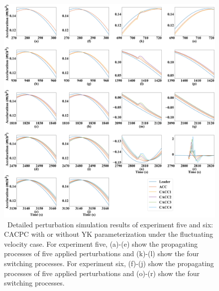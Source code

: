 \documentclass[a4paper,fleqn]{cas-sc}
\begin{document}
\begin{figure}
  \centering
  \includegraphics[width=14cm]{figs/fluat_detail.png}
  \caption{~Detailed perturbation simulation results of experiment five and six: CACPC with or without YK parameterization under the fluctuating velocity case. For experiment five, (a)-(e) show the propagating processes of five applied perturbations and (k)-(l) show the four switching processes. For experiment six, (f)-(j) show the propagating processes of five applied perturbations and (o)-(r) show the four switching processes.}
  \label{new6}
\end{figure}



\end{document}
